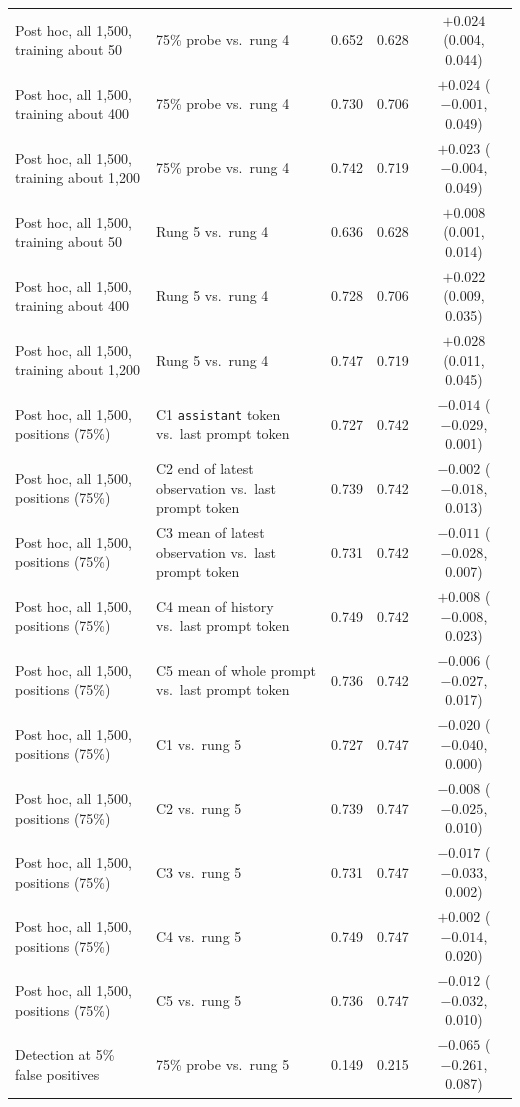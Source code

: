 \documentclass[11pt]{article}
\begin{document}
\begin{table}[t]
\begin{tabularx}{\linewidth}{@{}LLccc@{}}
Post hoc, all 1,500, training about 50 & 75\% probe vs.\ rung 4 & 0.652 & 0.628 & $+0.024$ (0.004, 0.044) \\
Post hoc, all 1,500, training about 400 & 75\% probe vs.\ rung 4 & 0.730 & 0.706 & $+0.024$ ($-0.001$, 0.049) \\
Post hoc, all 1,500, training about 1,200 & 75\% probe vs.\ rung 4 & 0.742 & 0.719 & $+0.023$ ($-0.004$, 0.049) \\
Post hoc, all 1,500, training about 50 & Rung 5 vs.\ rung 4 & 0.636 & 0.628 & $+0.008$ (0.001, 0.014) \\
Post hoc, all 1,500, training about 400 & Rung 5 vs.\ rung 4 & 0.728 & 0.706 & $+0.022$ (0.009, 0.035) \\
Post hoc, all 1,500, training about 1,200 & Rung 5 vs.\ rung 4 & 0.747 & 0.719 & $+0.028$ (0.011, 0.045) \\
Post hoc, all 1,500, positions (75\%) & C1 \texttt{assistant} token vs.\ last prompt token & 0.727 & 0.742 & $-0.014$ ($-0.029$, 0.001) \\
Post hoc, all 1,500, positions (75\%) & C2 end of latest observation vs.\ last prompt token & 0.739 & 0.742 & $-0.002$ ($-0.018$, 0.013) \\
Post hoc, all 1,500, positions (75\%) & C3 mean of latest observation vs.\ last prompt token & 0.731 & 0.742 & $-0.011$ ($-0.028$, 0.007) \\
Post hoc, all 1,500, positions (75\%) & C4 mean of history vs.\ last prompt token & 0.749 & 0.742 & $+0.008$ ($-0.008$, 0.023) \\
Post hoc, all 1,500, positions (75\%) & C5 mean of whole prompt vs.\ last prompt token & 0.736 & 0.742 & $-0.006$ ($-0.027$, 0.017) \\
Post hoc, all 1,500, positions (75\%) & C1 vs.\ rung 5 & 0.727 & 0.747 & $-0.020$ ($-0.040$, 0.000) \\
Post hoc, all 1,500, positions (75\%) & C2 vs.\ rung 5 & 0.739 & 0.747 & $-0.008$ ($-0.025$, 0.010) \\
Post hoc, all 1,500, positions (75\%) & C3 vs.\ rung 5 & 0.731 & 0.747 & $-0.017$ ($-0.033$, 0.002) \\
Post hoc, all 1,500, positions (75\%) & C4 vs.\ rung 5 & 0.749 & 0.747 & $+0.002$ ($-0.014$, 0.020) \\
Post hoc, all 1,500, positions (75\%) & C5 vs.\ rung 5 & 0.736 & 0.747 & $-0.012$ ($-0.032$, 0.010) \\
Detection at 5\% false positives & 75\% probe vs.\ rung 5 & 0.149 & 0.215 & $-0.065$ ($-0.261$, 0.087) \\

\end{tabularx}
\end{table}
\end{document}
